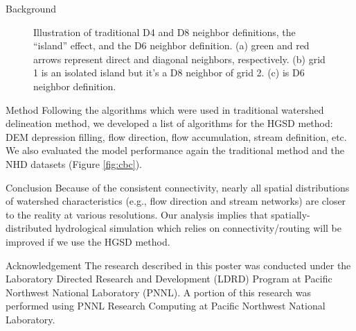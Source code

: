\documentclass[final]{beamer}
\newlength{\sepwid}
\newlength{\onecolwid}
\begin{document}
\begin{frame}[t]
\begin{columns}[t]
\begin{column}{\onecolwid}
\begin{block}{Background}
\begin{figure}[H]
\begin{subfigure}[t]{0.3\textwidth}
            \caption{}
            \label{fig:d6}
          \end{subfigure}

          \caption{Illustration of traditional D4 and D8 neighbor definitions, the ``island'' effect, and the D6 neighbor definition. (a) green and red arrows represent direct and diagonal neighbors, respectively. (b) grid 1 is an isolated island but it's a D8 neighbor of grid 2. (c) is D6 neighbor definition.}
          \label{fig:d4d8_island_d6}
        \end{figure}
      \end{block}

      \begin{block}{Method}
        Following the algorithms which were used in traditional watershed delineation method, we developed a list of algorithms for the HGSD method: DEM depression filling, flow direction, flow accumulation, stream definition, etc.
        We also evaluated the model performance again the traditional method and the NHD datasets (Figure \ref{fig:cbc}).
      \end{block}
      \begin{alertblock}{Conclusion}
        Because of the consistent connectivity, nearly all spatial distributions of watershed characteristics (e.g., flow direction and stream networks) are closer to the reality at various resolutions.
        Our analysis implies that spatially-distributed hydrological simulation which relies on connectivity/routing will be improved if we use the HGSD method.
      \end{alertblock}

      \begin{alertblock}{Acknowledgement}
        The research described in this poster was conducted under the Laboratory Directed Research and Development (LDRD) Program at Pacific Northwest National Laboratory (PNNL). A portion of this research was performed using PNNL Research Computing at Pacific Northwest National Laboratory.
      \end{alertblock}
    \end{column} %



\end{columns}
\end{frame}
\end{document}
